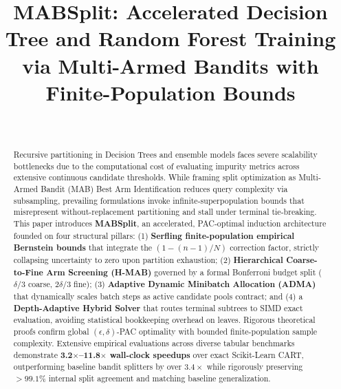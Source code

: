 \documentclass[11pt,journal,onecolumn]{IEEEtran}
\begin{document}
\title{\LARGE\bfseries MABSplit: Accelerated Decision Tree and Random Forest Training\\via Multi-Armed Bandits with Finite-Population Bounds}

\author{
    \\[0.6em]
}

\maketitle

\begin{abstract}
Recursive partitioning in Decision Trees and ensemble models faces severe scalability bottlenecks due to the computational cost of evaluating impurity metrics across extensive continuous candidate thresholds. While framing split optimization as Multi-Armed Bandit (MAB) Best Arm Identification reduces query complexity via subsampling, prevailing formulations invoke infinite-superpopulation bounds that misrepresent without-replacement partitioning and stall under terminal tie-breaking. This paper introduces \textbf{MABSplit}, an accelerated, PAC-optimal induction architecture founded on four structural pillars: (1) \textbf{Serfling finite-population empirical Bernstein bounds} that integrate the $(1 - (n-1)/N)$ correction factor, strictly collapsing uncertainty to zero upon partition exhaustion; (2) \textbf{Hierarchical Coarse-to-Fine Arm Screening (H-MAB)} governed by a formal Bonferroni budget split ($\delta/3$ coarse, $2\delta/3$ fine); (3) \textbf{Adaptive Dynamic Minibatch Allocation (ADMA)} that dynamically scales batch steps as active candidate pools contract; and (4) a \textbf{Depth-Adaptive Hybrid Solver} that routes terminal subtrees to SIMD exact evaluation, avoiding statistical bookkeeping overhead on leaves. Rigorous theoretical proofs confirm global $(\epsilon, \delta)$-PAC optimality with bounded finite-population sample complexity. Extensive empirical evaluations across diverse tabular benchmarks demonstrate \textbf{3.2$\times$--11.8$\times$ wall-clock speedups} over exact Scikit-Learn CART, outperforming baseline bandit splitters by over $3.4\times$ while rigorously preserving $>99.1\%$ internal split agreement and matching baseline generalization.
\end{abstract}
\end{document}
